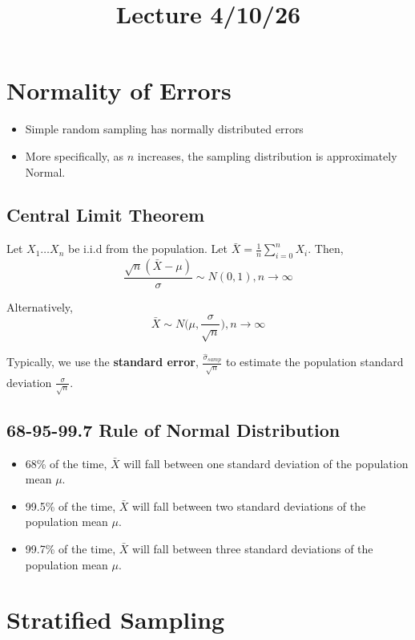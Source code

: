 \documentclass{article}
\title{Lecture 4/10/26}
\author{}
\date{}
\begin{document}
\maketitle

\section{Normality of Errors}

\begin{itemize}
    \item Simple random sampling has normally distributed errors
    \item More specifically, as $n$ increases, the sampling distribution is approximately Normal.
\end{itemize}

\subsection{Central Limit Theorem}

Let $X_1 \dots X_n$ be i.i.d from the population. Let $\bar{X} = \frac{1}{n}\sum^n_{i = 0}X_i$. Then, 
\[
    \frac{\sqrt{n}(\bar{X} - \mu)}{\sigma} \sim N(0,1), n \rightarrow \infty
\]

Alternatively,
\[
    \bar{X} \sim N\biggr(\mu, \frac{\sigma}{\sqrt{n}}\biggr), n \rightarrow \infty
\]

Typically, we use the \textbf{standard error}, $\frac{\hat{\sigma}_{samp}}{\sqrt{n}}$ to estimate the population standard deviation $\frac{\sigma}
{\sqrt{n}}$.

\subsection{68-95-99.7 Rule of Normal Distribution}

\begin{itemize}
    \item 68\% of the time, $\bar{X}$ will fall between one standard deviation of the population mean $\mu$.
    \item 99.5\% of the time, $\bar{X}$  will fall between two standard deviations of the population mean $\mu$.
    \item 99.7\% of the time, $\bar{X}$ will fall between three standard deviations of the population mean $\mu$.
\end{itemize}

\newpage

\section{Stratified Sampling}
\end{document}
